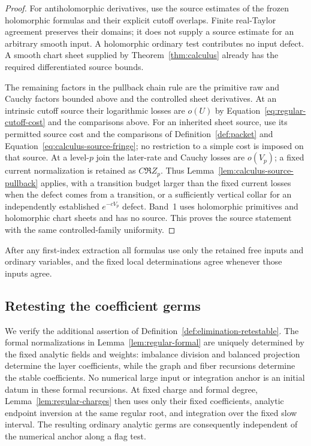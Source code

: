 \begin{proof}
For antiholomorphic derivatives, use the source estimates of the frozen
holomorphic formulas and their explicit cutoff overlaps. Finite real-Taylor
agreement preserves their domains; it does not supply a source estimate
for an arbitrary smooth input. A holomorphic ordinary test contributes
no input defect. A smooth chart sheet supplied by
Theorem~\ref{thm:calculus} already has the required differentiated
source bounds.

The remaining factors in the pullback chain rule are the primitive raw
and Cauchy factors bounded above and the controlled sheet derivatives.
At an intrinsic cutoff source their logarithmic losses are $o(U)$ by
Equation~\eqref{eq:regular-cutoff-cost} and the comparisons above.
For an inherited sheet source, use its permitted source cost and the
comparisons of Definition~\ref{def:packet} and
Equation~\eqref{eq:calculus-source-fringe}; no restriction to a simple
cost is imposed on that source. At a level-$p$ join the later-rate and Cauchy losses are $o(V_p)$;
a fixed current normalization is retained as $C\Re Z_p$. Thus
Lemma~\ref{lem:calculus-source-pullback} applies, with a transition
budget larger than the fixed current losses when the defect comes from
a transition, or a sufficiently vertical collar for an independently
established $e^{-cV_p}$ defect. Band~1 uses holomorphic primitives and
holomorphic chart sheets and has no source. This proves the source
statement with the same controlled-family uniformity.
\end{proof}

After any first-index extraction all formulas use only the retained
free inputs and ordinary variables, and the fixed local determinations
agree whenever those inputs agree.

\subsection{Retesting the coefficient germs}

We verify the additional assertion of
Definition~\ref{def:elimination-retestable}.  The formal
normalizations in Lemma~\ref{lem:regular-formal} are uniquely determined
by the fixed analytic fields and weights: imbalance division and
balanced projection determine the layer coefficients, while the graph
and fiber recursions determine the stable coefficients.  No numerical
large input or integration anchor is an initial datum in these formal
recursions.  At fixed charge and formal degree,
Lemma~\ref{lem:regular-charges} then uses only their fixed coefficients,
analytic endpoint inversion at the same regular root, and integration
over the fixed slow interval.  The resulting ordinary analytic germs
are consequently independent of the numerical anchor along a flag
test.

